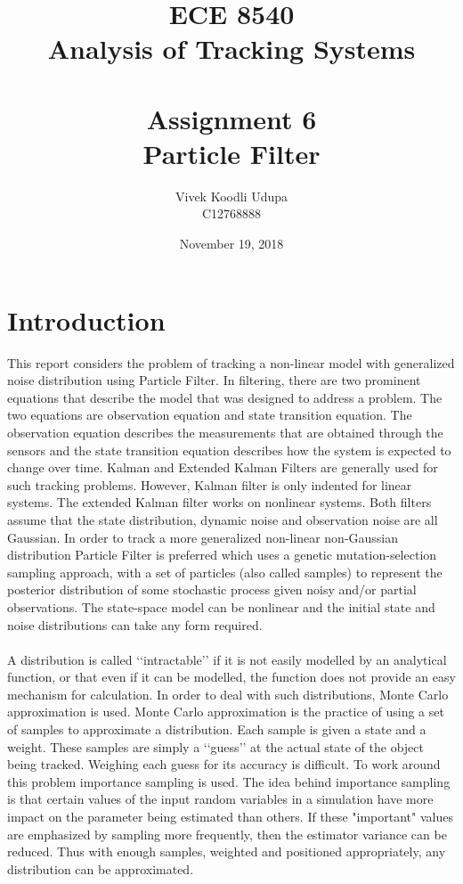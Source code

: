 \documentclass[12pt]{article}
\title{ECE 8540 \\ Analysis of Tracking Systems \\ \quad \\
	Assignment 6 \\ Particle Filter}
\author{Vivek Koodli Udupa \\ C12768888}
\date{November 19, 2018 }
\begin{document}
\begin{mdframed}
\maketitle
\end{mdframed}


\section{Introduction}
This report considers the problem of tracking a non-linear model with generalized noise distribution using Particle Filter. In filtering, there are two prominent equations that describe the model that was designed to address a problem. The two equations are observation equation and state transition equation. The observation equation describes the measurements that are obtained through the sensors and the state transition equation describes how the system is expected to change over time. Kalman and Extended Kalman Filters are generally used for such tracking problems. However, Kalman filter is only indented for linear systems. The extended Kalman filter works on nonlinear systems. Both filters assume that the state distribution, dynamic noise and observation noise are all Gaussian. In order to track a more generalized non-linear non-Gaussian distribution Particle Filter is preferred which uses a genetic mutation-selection sampling approach, with a set of particles (also called samples) to represent the posterior distribution of some stochastic process given noisy and/or partial observations. The state-space model can be nonlinear and the initial state and noise distributions can take any form required.\\ 
\\ \indent
A distribution is called \lq\lq{intractable}\rq\rq{} if it is not easily modelled by an analytical function, or that even if it can be modelled, the function does not provide an easy mechanism for calculation. In order to deal with such distributions, Monte Carlo approximation is used. Monte Carlo approximation is the practice of using a set of samples to approximate a distribution. Each sample is given a state and a weight. These samples are simply a \lq\lq{guess}\rq\rq{} at the actual state of the object being tracked. Weighing each guess for its accuracy is difficult. To work around this problem importance sampling is used. The idea behind importance sampling is that certain values of the input random variables in a simulation have more impact on the parameter being estimated than others. If these "important" values are emphasized by sampling more frequently, then the estimator variance can be reduced. Thus with enough samples, weighted and positioned appropriately, any distribution can be approximated.  \\ 
\end{document}
